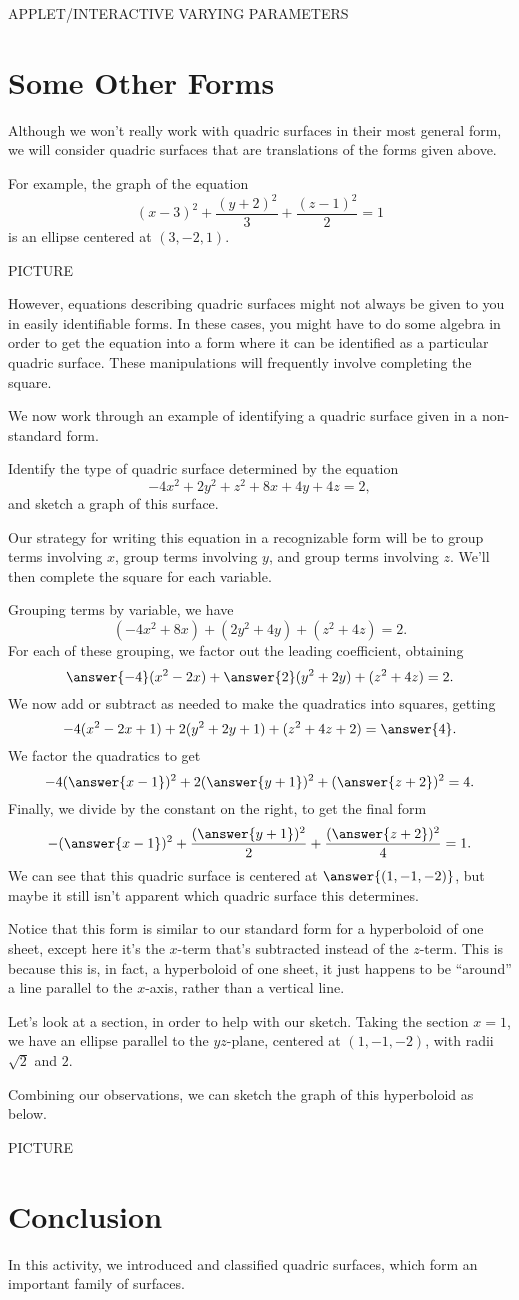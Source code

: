 \documentclass{ximera}
\begin{document}
APPLET/INTERACTIVE VARYING PARAMETERS

\section{Some Other Forms}

Although we won't really work with quadric surfaces in their most general form, we will consider quadric surfaces that are translations of the forms given above.

For example, the graph of the equation
\[
(x-3)^2 + \frac{(y+2)^2}{3} + \frac{(z-1)^2}{2} = 1
\]
is an ellipse centered at $(3,-2,1)$.

PICTURE

However, equations describing quadric surfaces might not always be given to you in easily identifiable forms. In these cases, you might have to do some algebra in order to get the equation into a form where it can be identified as a particular quadric surface. These manipulations will frequently involve completing the square.

We now work through an example of identifying a quadric surface given in a non-standard form.

\begin{example}
Identify the type of quadric surface determined by the equation
\[
-4x^2 + 2y^2 + z^2 + 8x + 4y+4z = 2,
\]
and sketch a graph of this surface.

Our strategy for writing this equation in a recognizable form will be to group terms involving $x$, group terms involving $y$, and group terms involving $z$. We'll then complete the square for each variable.

Grouping terms by variable, we have
\[
(-4x^2+8x) + (2y^2 + 4y) + (z^2 + 4z) = 2.
\]
For each of these grouping, we factor out the leading coefficient, obtaining
\[
\answer{-4}(x^2-2x) + \answer{2}(y^2 + 2y) + (z^2 + 4z) = 2.
\]
We now add or subtract as needed to make the quadratics into squares, getting
\[
-4(x^2-2x + 1) + 2(y^2 + 2y + 1) + (z^2 + 4z + 2) = \answer{4}.
\]
We factor the quadratics to get
\[
-4(\answer{x-1})^2 + 2(\answer{y+1})^2 + (\answer{z+2})^2 = 4.
\]
Finally, we divide by the constant on the right, to get the final form
\[
-(\answer{x-1})^2 + \frac{(\answer{y+1})^2}{2} + \frac{(\answer{z+2})^2}{4} = 1.
\]
We can see that this quadric surface is centered at $\answer{(1,-1,-2)}$, but maybe it still isn't apparent which quadric surface this determines.

Notice that this form is similar to our standard form for a hyperboloid of one sheet, except here it's the $x$-term that's subtracted instead of the $z$-term. This is because this is, in fact, a hyperboloid of one sheet, it just happens to be ``around'' a line parallel to the $x$-axis, rather than a vertical line.

Let's look at a section, in order to help with our sketch. Taking the section $x = 1$, we have an ellipse parallel to the $yz$-plane, centered at $(1,-1,-2)$, with radii $\sqrt{2}$ and $2$.

Combining our observations, we can sketch the graph of this hyperboloid as below.

PICTURE
\end{example}

\section{Conclusion}

In this activity, we introduced and classified quadric surfaces, which form an important family of surfaces.
\end{document}

